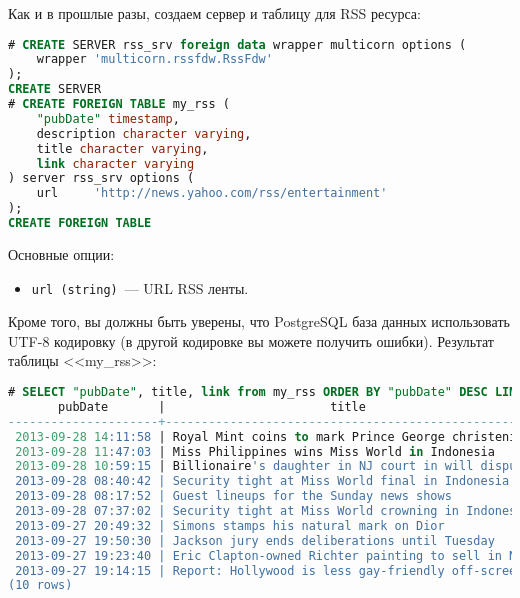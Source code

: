 Как и в прошлые разы, создаем сервер и таблицу для RSS ресурса:

\begin{lstlisting}[language=SQL,label=lst:pgmulticorn-rss2,caption=Multicorn]
# CREATE SERVER rss_srv foreign data wrapper multicorn options (
    wrapper 'multicorn.rssfdw.RssFdw'
);
CREATE SERVER
# CREATE FOREIGN TABLE my_rss (
    "pubDate" timestamp,
    description character varying,
    title character varying,
    link character varying
) server rss_srv options (
    url     'http://news.yahoo.com/rss/entertainment'
);
CREATE FOREIGN TABLE
\end{lstlisting}

Основные опции:

\begin{itemize}
  \item \lstinline!url (string)!~--- URL RSS ленты.
\end{itemize}

Кроме того, вы должны быть уверены, что PostgreSQL база данных использовать UTF-8 кодировку (в другой кодировке вы можете получить ошибки). Результат таблицы <<my\_rss>>:

\begin{lstlisting}[language=SQL,label=lst:pgmulticorn-rss3,caption=Multicorn]
# SELECT "pubDate", title, link from my_rss ORDER BY "pubDate" DESC LIMIT 10;
       pubDate       |                       title                        |                                         link
---------------------+----------------------------------------------------+--------------------------------------------------------------------------------------
 2013-09-28 14:11:58 | Royal Mint coins to mark Prince George christening | http://news.yahoo.com/royal-mint-coins-mark-prince-george-christening-115906242.html
 2013-09-28 11:47:03 | Miss Philippines wins Miss World in Indonesia      | http://news.yahoo.com/miss-philippines-wins-miss-world-indonesia-144544381.html
 2013-09-28 10:59:15 | Billionaire's daughter in NJ court in will dispute | http://news.yahoo.com/billionaires-daughter-nj-court-dispute-144432331.html
 2013-09-28 08:40:42 | Security tight at Miss World final in Indonesia    | http://news.yahoo.com/security-tight-miss-world-final-indonesia-123714041.html
 2013-09-28 08:17:52 | Guest lineups for the Sunday news shows            | http://news.yahoo.com/guest-lineups-sunday-news-shows-183815643.html
 2013-09-28 07:37:02 | Security tight at Miss World crowning in Indonesia | http://news.yahoo.com/security-tight-miss-world-crowning-indonesia-113634310.html
 2013-09-27 20:49:32 | Simons stamps his natural mark on Dior             | http://news.yahoo.com/simons-stamps-natural-mark-dior-223848528.html
 2013-09-27 19:50:30 | Jackson jury ends deliberations until Tuesday      | http://news.yahoo.com/jackson-jury-ends-deliberations-until-tuesday-235030969.html
 2013-09-27 19:23:40 | Eric Clapton-owned Richter painting to sell in NYC | http://news.yahoo.com/eric-clapton-owned-richter-painting-sell-nyc-201447252.html
 2013-09-27 19:14:15 | Report: Hollywood is less gay-friendly off-screen  | http://news.yahoo.com/report-hollywood-less-gay-friendly-off-screen-231415235.html
(10 rows)
\end{lstlisting}


